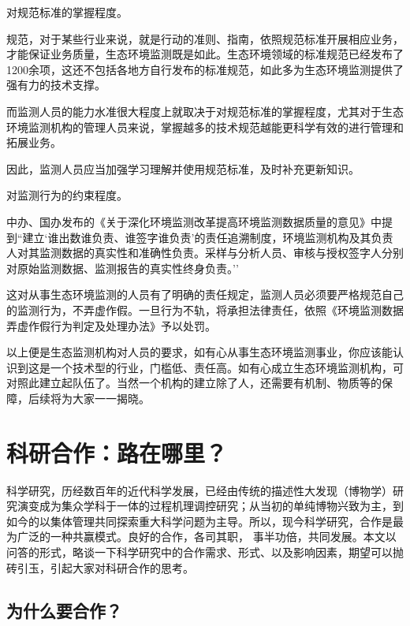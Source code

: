 \documentclass[
]{book}
\begin{document}
对规范标准的掌握程度。

规范，对于某些行业来说，就是行动的准则、指南，依照规范标准开展相应业务，才能保证业务质量，生态环境监测既是如此。生态环境领域的标准规范已经发布了1200余项，这还不包括各地方自行发布的标准规范，如此多为生态环境监测提供了强有力的技术支撑。

而监测人员的能力水准很大程度上就取决于对规范标准的掌握程度，尤其对于生态环境监测机构的管理人员来说，掌握越多的技术规范越能更科学有效的进行管理和拓展业务。

因此，监测人员应当加强学习理解并使用规范标准，及时补充更新知识。

对监测行为的约束程度。

中办、国办发布的《关于深化环境监测改革提高环境监测数据质量的意见》中提到``建立`谁出数谁负责、谁签字谁负责'的责任追溯制度，环境监测机构及其负责人对其监测数据的真实性和准确性负责。采样与分析人员、审核与授权签字人分别对原始监测数据、监测报告的真实性终身负责。''

这对从事生态环境监测的人员有了明确的责任规定，监测人员必须要严格规范自己的监测行为，不弄虚作假。一旦行为不轨，将承担法律责任，依照《环境监测数据弄虚作假行为判定及处理办法》予以处罚。

以上便是生态监测机构对人员的要求，如有心从事生态环境监测事业，你应该能认识到这是一个技术型的行业，门槛低、责任高。如有心成立生态环境监测机构，可对照此建立起队伍了。当然一个机构的建立除了人，还需要有机制、物质等的保障，后续将为大家一一揭晓。

\hypertarget{ux79d1ux7814ux5408ux4f5cux8defux5728ux54eaux91cc}{%
\section{科研合作：路在哪里？}\label{ux79d1ux7814ux5408ux4f5cux8defux5728ux54eaux91cc}}

科学研究，历经数百年的近代科学发展，已经由传统的描述性大发现（博物学）研究演变成为集众学科于一体的过程机理调控研究；从当初的单纯博物兴致为主，到如今的以集体管理共同探索重大科学问题为主导。所以，现今科学研究，合作是最为广泛的一种共赢模式。良好的合作，各司其职， 事半功倍，共同发展。本文以问答的形式，略谈一下科学研究中的合作需求、形式、以及影响因素，期望可以抛砖引玉，引起大家对科研合作的思考。

\hypertarget{ux4e3aux4ec0ux4e48ux8981ux5408ux4f5c}{%
\subsection{为什么要合作？}\label{ux4e3aux4ec0ux4e48ux8981ux5408ux4f5c}}
\end{document}
